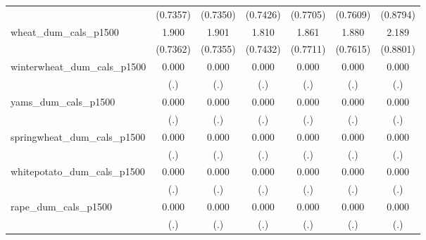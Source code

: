 {\begin{tabular}{l*{6}{c}}
                    &    (0.7357)         &    (0.7350)         &    (0.7426)         &    (0.7705)         &    (0.7609)         &    (0.8794)         \\
\addlinespace
wheat\_dum\_cals\_p1500&       1.900\sym{**} &       1.901\sym{**} &       1.810\sym{*}  &       1.861\sym{*}  &       1.880\sym{*}  &       2.189\sym{*}  \\
                    &    (0.7362)         &    (0.7355)         &    (0.7432)         &    (0.7711)         &    (0.7615)         &    (0.8801)         \\
\addlinespace
winterwheat\_dum\_cals\_p1500&       0.000         &       0.000         &       0.000         &       0.000         &       0.000         &       0.000         \\
                    &         (.)         &         (.)         &         (.)         &         (.)         &         (.)         &         (.)         \\
\addlinespace
yams\_dum\_cals\_p1500 &       0.000         &       0.000         &       0.000         &       0.000         &       0.000         &       0.000         \\
                    &         (.)         &         (.)         &         (.)         &         (.)         &         (.)         &         (.)         \\
\addlinespace
springwheat\_dum\_cals\_p1500&       0.000         &       0.000         &       0.000         &       0.000         &       0.000         &       0.000         \\
                    &         (.)         &         (.)         &         (.)         &         (.)         &         (.)         &         (.)         \\
\addlinespace
whitepotato\_dum\_cals\_p1500&       0.000         &       0.000         &       0.000         &       0.000         &       0.000         &       0.000         \\
                    &         (.)         &         (.)         &         (.)         &         (.)         &         (.)         &         (.)         \\
\addlinespace
rape\_dum\_cals\_p1500 &       0.000         &       0.000         &       0.000         &       0.000         &       0.000         &       0.000         \\
                    &         (.)         &         (.)         &         (.)         &         (.)         &         (.)         &         (.)         \\

\end{tabular}}
